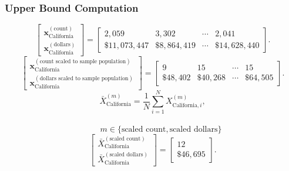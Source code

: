 \subsubsection{Upper Bound Computation}
\[
\begin{bmatrix}
\mathbf{x}_{\text{California}}^{(\text{count})}\\
\mathbf{x}_{\text{California}}^{(\text{dollars})}
\end{bmatrix}
=
\begin{bmatrix}
2,059 & 3,302 & \cdots & 2,041\\
\$11,073,447 &\$8,864,419  & \cdots &\$14,628,440 
\end{bmatrix}.
\]
\[
\begin{bmatrix}
\mathbf{x}_{\text{California}}^{(\text{count scaled to sample population})}\\
\mathbf{x}_{\text{California}}^{(\text{dollars scaled to sample population})}
\end{bmatrix}
=
\begin{bmatrix}
9 & 15 & \cdots & 15\\
\$48,402 &\$40,268 & \cdots &\$64,505 
\end{bmatrix}.
\]
\[
\bar{X}_{\text{California}}^{(m)}
= \frac{1}{N}\sum_{i=1}^{N} X_{\text{California},i}^{(m)},
\]
\\
\[
\qquad
m \in \{\text{scaled count},\text{scaled dollars}\}
\]
\[
\begin{bmatrix}
\bar{X}_{\text{California}}^{(\text{scaled count})}\\
\bar{X}_{\text{California}}^{(\text{scaled dollars})}
\end{bmatrix}
=
\begin{bmatrix}
12\\
\$46,695
\end{bmatrix}.
\]
